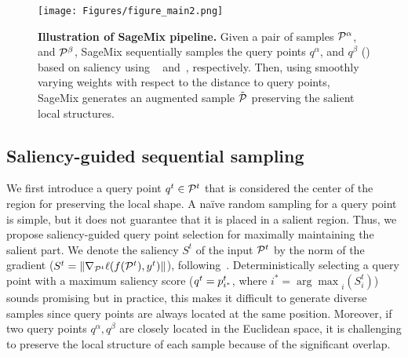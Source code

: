 \documentclass{article}
\begin{document}
\begin{figure}[t]
\centering
\texttt{[image: Figures/figure\_main2.png]}
\caption{\textbf{Illustration of SageMix pipeline.} 
Given a pair of samples $\Point^\alpha$, and $\Point^\beta$, SageMix sequentially samples the query points $q^\alpha$, and $q^\beta$ () based on saliency using ~ and~, respectively. 
Then, using smoothly varying weights with respect to the distance to query points, SageMix generates an augmented sample $\tilde{\Point}$ preserving the salient local structures.}



\label{fig:figure_main}
\end{figure} \subsection{Saliency-guided sequential sampling}
\label{sec:method.1}

We first introduce a query point $q^t \in \Point^{t}$ that is considered the center of the region for preserving the local shape. A na\"ive random sampling for a query point is simple, but it does not guarantee that it is placed in a salient region. Thus, we propose saliency-guided query point selection for maximally maintaining the salient part.
We denote the saliency $S^t$ of the input $\Point^t$ by the norm of the gradient (\ie $S^t = \|\nabla_{\Point^t} \ell(f(\Point^t),\gt^t)\|$), following~\cite{kim2020puzzle,DBLP:conf/iclr/KimCJS21}.
Deterministically selecting a query point with a maximum saliency score (\ie $q^t = \point^t_{i^\ast}$, where ${i^\ast} = {\arg\max}_i(S^t_i)$) sounds promising but in practice, this makes it difficult to generate diverse samples since query points are always located at the same position.
Moreover, if two query points $q^\alpha, q^\beta$ are closely located in the Euclidean space, it is challenging to preserve the local structure of each sample because of the significant overlap.
\end{document}
